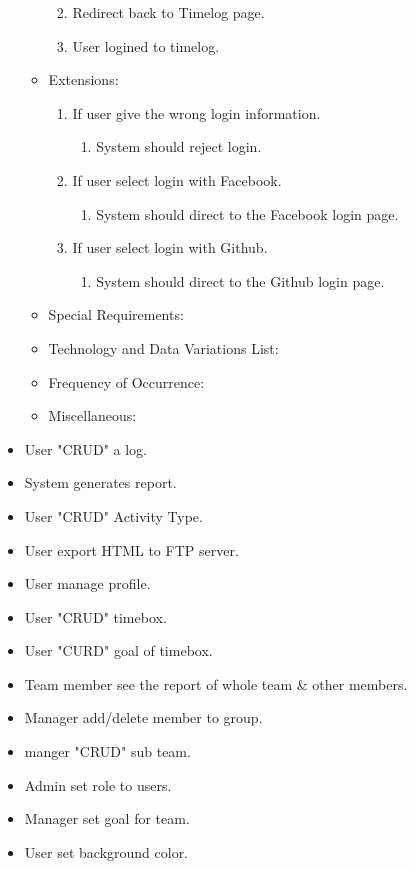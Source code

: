 \documentclass[12pt, a4paper]{article}
\begin{document}
\begin{CJK*}{UTF8}{bkai}
\begin{itemize}
\begin{itemize}
\begin{enumerate}
\begin{itemize}
                \end{itemize}
              \item Redirect back to Timelog page.
              \item User logined to timelog.
            \end{enumerate}
          \item Extensions:
            \begin{enumerate}
              \item If user give the wrong login information.
                \begin{enumerate}
                  \item System should reject login.
                \end{enumerate}
              \item If user select login with Facebook.
                \begin{enumerate}
                  \item System should direct to the Facebook login page.
                \end{enumerate}
              \item If user select login with Github.
                \begin{enumerate}
                  \item System should direct to the Github login page.
                \end{enumerate}
            \end{enumerate}
          \item Special Requirements:
          \item Technology and Data Variations List:
          \item Frequency of Occurrence:
          \item Miscellaneous:
        \end{itemize}
      \item User "CRUD" a log.
      \item System generates report.
      \item User "CRUD" Activity Type.
      \item User export HTML to FTP server.
      \item User manage profile.
      \item User "CRUD" timebox.
      \item User "CURD" goal of timebox.
      \item Team member see the report of whole team \& other members.
      \item Manager add/delete member to group.
      \item manger "CRUD" sub team.
      \item Admin set role to users.
      \item Manager set goal for team.
      \item User set background color.
    \end{itemize}


\end{CJK*}
\end{document}
